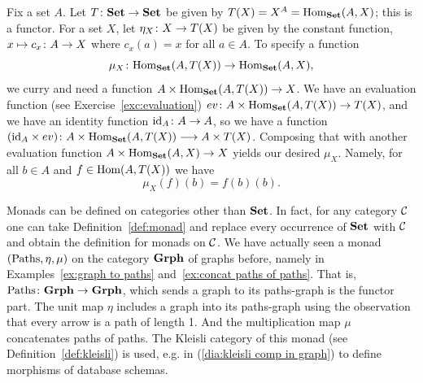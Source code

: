 \documentclass[CT4S-EN-RU]{subfiles}
\begin{document}
\begin{exerciseRUS}\label{exc:exceptions}
\end{exerciseRUS}

\begin{exampleENG}\label{ex:experimenter matters 2}
Fix a set $A$. Let $T\colon{\mathbf{Set}}\rightarrow{\mathbf{Set}}$ be given by $T(X)=X^A=\textnormal{Hom}_{\mathbf{Set}}(A,X)$; this is a functor. For a set $X$, let $\eta_X\colon X\rightarrow T(X)$ be given by the constant function, $x\mapsto c_x\colon A\rightarrow X$ where $c_x(a)=x$ for all $a\in A$. To specify a function
$$\mu_X\colon\textnormal{Hom}_{\mathbf{Set}}(A,T(X))\rightarrow\textnormal{Hom}_{\mathbf{Set}}(A,X),$$ we curry and need a function $A\times\textnormal{Hom}_{\mathbf{Set}}(A,T(X))\rightarrow X$. We have an evaluation function (see Exercise~\ref{exc:evaluation}) $ev\colon A\times\textnormal{Hom}_{\mathbf{Set}}(A,T(X))\rightarrow T(X)$, and we have an identity function $\textnormal{id}_A\colon A\rightarrow A$, so we have a function $(\textnormal{id}_A\times ev)\colon A\times\textnormal{Hom}_{\mathbf{Set}}(A,T(X))\longrightarrow A\times T(X)$. Composing that with another evaluation function $A\times\textnormal{Hom}_{\mathbf{Set}}(A,X)\rightarrow X$ yields our desired $\mu_X$. Namely, for all $b\in A$ and $f\in\textnormal{Hom}(A,T(X))$ we have
$$\mu_X(f)(b)=f(b)(b).$$
\end{exampleENG}

\begin{exampleRUS}\label{ex:experimenter matters 2}
\end{exampleRUS}

\begin{remarkENG}
Monads can be defined on categories other than ${\mathbf{Set}}$. In fact, for any category $\mathcal{C}$ one can take Definition~\ref{def:monad} and replace every occurrence of ${\mathbf{Set}}$ with $\mathcal{C}$ and obtain the definition for monads on $\mathcal{C}$. We have actually seen a monad $(\textnormal{Paths},\eta,\mu)$ on the category ${\mathbf{Grph}}$ of graphs before, namely in Examples~\ref{ex:graph to paths} and~\ref{ex:concat paths of paths}. That is, $\textnormal{Paths}\colon{\mathbf{Grph}}\rightarrow{\mathbf{Grph}}$, which sends a graph to its paths-graph is the functor part. The unit map $\eta$ includes a graph into its paths-graph using the observation that every arrow is a path of length 1. And the multiplication map $\mu$ concatenates paths of paths. The Kleisli category of this monad (see Definition~\ref{def:kleisli}) is used, e.g. in (\ref{dia:kleisli comp in graph}) to define morphisms of database schemas.
\end{remarkENG}

\begin{remarkRUS}
\end{remarkRUS}
\end{document}
